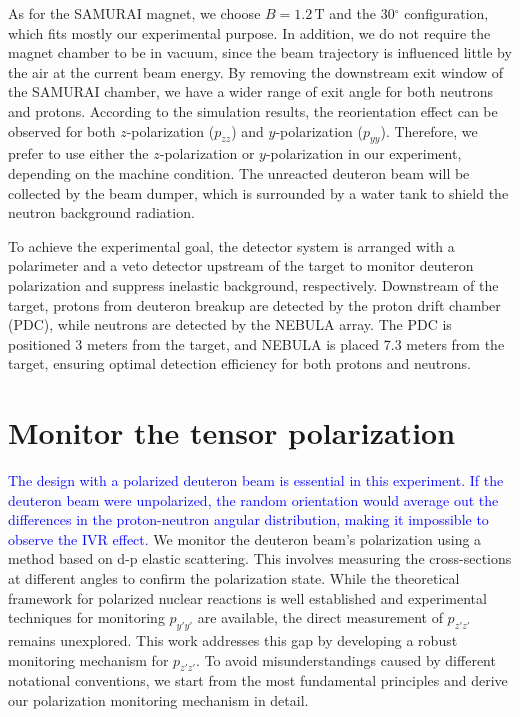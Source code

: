 \documentclass[twocolumn,twoside,showpacs,showkeys,preprintnumbers,superscriptaddress,amsmath,amssymb,prc,nofootinbib,a4paper]{revtex4}
\begin{document}
As for the SAMURAI magnet, we  choose $B=1.2\,\mathrm{T}$ and
the $30{^\circ}$ configuration, which fits mostly our experimental
purpose. In addition, we do not require the magnet chamber to be in
vacuum, since the beam trajectory is influenced little by the air
at the current beam energy. By removing the downstream exit window of the SAMURAI chamber, we
have a wider range of exit angle for both neutrons and protons. 
According
to the simulation results, the reorientation effect can be observed
for both $z$-polarization ($p_{zz}$) and $y$-polarization ($p_{yy}$). Therefore,
we prefer to use either the $z$-polarization or $y$-polarization in our
experiment, depending on the machine condition. The unreacted deuteron beam will be collected
by the beam dumper, which is surrounded by a water tank to shield the neutron background radiation.

To achieve the experimental goal, the detector system is arranged with a polarimeter and a veto detector upstream of the target to monitor deuteron polarization and suppress inelastic background, respectively. Downstream of the target, protons from deuteron breakup are detected by the proton drift chamber (PDC), while neutrons are detected by the NEBULA array. The PDC is positioned 3 meters from the target, and NEBULA is placed 7.3 meters from the target, ensuring optimal detection efficiency for both protons and neutrons.



 
\section{Monitor the tensor polarization }
\label{sec:MonitorPol}


\textcolor{blue}{The design with a polarized deuteron beam is essential in this experiment.}
\textcolor{blue}{If the deuteron beam were unpolarized, the random orientation would average out the differences in the proton-neutron angular distribution, making it impossible to observe the IVR effect.}
We monitor the deuteron beam's polarization using a method based on d-p elastic scattering. This involves measuring the cross-sections at different angles to confirm the polarization state. While the theoretical framework for polarized nuclear reactions is well established and experimental techniques for monitoring $p_{y'y'}$ are available, the direct measurement of $p_{z'z'}$ remains unexplored. This work addresses this gap by developing a robust monitoring mechanism for $p_{z'z'}$. To avoid misunderstandings caused by different notational conventions, we start from the most fundamental principles and derive our polarization monitoring mechanism in detail.
\end{document}
